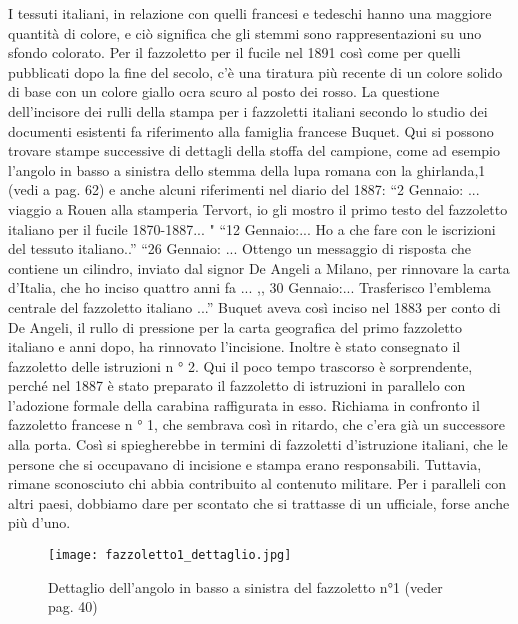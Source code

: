  I tessuti italiani, in relazione con quelli francesi e tedeschi hanno una maggiore quantità di colore, e ciò significa che gli stemmi sono rappresentazioni su uno sfondo colorato.
   Per il fazzoletto per il fucile nel 1891 così come per quelli pubblicati dopo la fine del secolo, c'è una tiratura più recente di un colore solido di base con un colore giallo ocra scuro al posto dei rosso. La questione dell'incisore dei rulli della stampa per i fazzoletti italiani secondo lo studio dei documenti esistenti fa riferimento alla famiglia francese Buquet. Qui si possono trovare stampe successive di dettagli della stoffa del campione, come ad esempio l'angolo in basso a sinistra dello stemma della lupa romana con la ghirlanda,1 (vedi a pag. 62) e anche alcuni riferimenti nel diario del 1887:  
   “2 Gennaio: ... viaggio a Rouen alla stamperia Tervort, io gli mostro il primo testo del fazzoletto italiano per il fucile 1870-1887... " 
   “12 Gennaio:... Ho a che fare con le iscrizioni del tessuto italiano..”
   “26 Gennaio: ... Ottengo un messaggio di risposta che contiene un cilindro, inviato dal signor De Angeli a Milano, per rinnovare la carta d'Italia, che ho inciso quattro anni fa ...
,, 30 Gennaio:... Trasferisco l'emblema centrale del fazzoletto italiano ...”
   Buquet aveva così inciso nel 1883 per conto di De Angeli, il rullo di pressione per la carta geografica del primo fazzoletto italiano e anni dopo, ha rinnovato l'incisione. Inoltre è stato consegnato il fazzoletto delle istruzioni n ° 2. Qui il poco tempo trascorso è sorprendente, perché nel 1887 è stato preparato il fazzoletto di istruzioni in parallelo con l'adozione formale della carabina raffigurata in esso. Richiama in confronto il fazzoletto francese n ° 1, che sembrava così in ritardo, che c'era già un successore alla porta.
   Così si spiegherebbe in termini di fazzoletti d'istruzione italiani, che le persone che si occupavano di incisione e stampa erano responsabili. Tuttavia, rimane sconosciuto chi abbia contribuito al contenuto militare. Per i paralleli con altri paesi, dobbiamo dare per scontato che si trattasse di un ufficiale, forse anche più d'uno.

\newpage

\begin{figure}[h]
	\centering
		\texttt{[image: fazzoletto1\_dettaglio.jpg]}
	\caption{Dettaglio dell’angolo in basso a sinistra del fazzoletto n°1 (veder pag. 40)}
	\label{fig:fazzoletto1_dettaglio}
\end{figure}

\newpage

